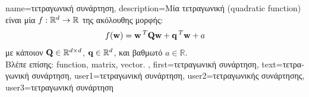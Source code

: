 {name={\foreignlanguage{greek}{τετραγωνική συνάρτηση}},
	description={\foreignlanguage{greek}{Μία τετραγωνική}  
		(quadratic function) \foreignlanguage{greek}{είναι μία}  
		$f: \mathbb{R}^{d} \rightarrow \mathbb{R}$ \foreignlanguage{greek}{της ακόλουθης μορφής}:  
		$$f({\bf w}) =  {\bf w}\,^{T} \mathbf{Q} \mathbf{w} + \mathbf{q}\,^{T} {\bf w}+a$$  
		\foreignlanguage{greek}{με κάποιον}  $\mathbf{Q} \in \mathbb{R}^{d \times d}$, 
		 ${\bf q} \in \mathbb{R}^{d}$, \foreignlanguage{greek}{και βαθμωτό} $a \in \mathbb{R}$. 
		\\
		\foreignlanguage{greek}{Βλέπε επίσης:} \gls{function}, \gls{matrix}, \gls{vector}. },
	first={\foreignlanguage{greek}{τετραγωνική συνάρτηση}},
	text={\foreignlanguage{greek}{τετραγωνική συνάρτηση}},
	user1={\foreignlanguage{greek}{τετραγωνική συνάρτηση}}, %
  	user2={\foreignlanguage{greek}{τετραγωνικής συνάρτησης}}, %
	user3={\foreignlanguage{greek}{τετραγωνική συνάρτηση}} %
}


